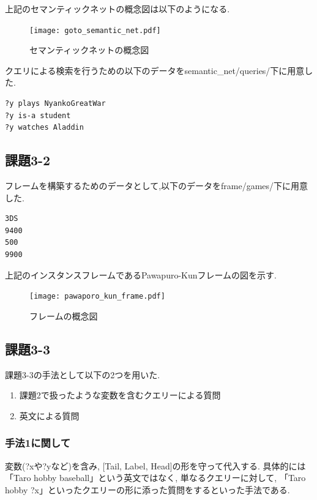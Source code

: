 \documentclass[uplatex,12pt]{jsarticle}
\begin{document}
上記のセマンティックネットの概念図は以下のようになる.

\begin{figure}[htbp]
 \begin{center}
  \texttt{[image: goto\_semantic\_net.pdf]}
 \end{center}
 \caption[]{セマンティックネットの概念図}\label{fig:fig1.1}
\end{figure}

クエリによる検索を行うための以下のデータをsemantic\_net/queries/下に用意した.\\

\begin{lstlisting}[caption=semantic\_net/queries/goto.txt, label=mid]
?y plays NyankoGreatWar
?y is-a student
?y watches Aladdin
\end{lstlisting}
\subsection{課題3-2}
フレームを構築するためのデータとして,以下のデータをframe/games/下に用意した.
\begin{lstlisting}[caption=frame/games/Pawapuro-Kun.txt, label=mid]
3DS
9400
500
9900
\end{lstlisting}

上記のインスタンスフレームであるPawapuro-Kunフレームの図を示す.
\begin{figure}[htbp]
 \begin{center}
  \texttt{[image: pawaporo\_kun\_frame.pdf]}
 \end{center}
 \caption[]{フレームの概念図}\label{fig:fig1.1}
\end{figure}

\subsection{課題3-3}
課題3-3の手法として以下の2つを用いた.

\begin{enumerate}
\item 課題2で扱ったような変数を含むクエリーによる質問
\item 英文による質問
\end{enumerate}

\subsubsection{手法1に関して}
変数(?xや?yなど)を含み, [Tail, Label, Head]の形を守って代入する. 具体的には「Taro hobby baseball」という英文ではなく, 単なるクエリーに対して, 「Taro hobby ?x」といったクエリーの形に添った質問をするといった手法である.
\end{document}
